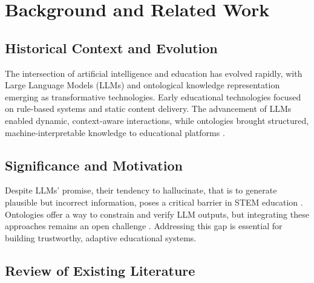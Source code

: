 \chapter{Background and Related Work}
\label{chap:background}


\section{Historical Context and Evolution}

The intersection of artificial intelligence and education has evolved rapidly, with Large Language Models (LLMs) and ontological knowledge representation emerging as transformative technologies. Early educational technologies focused on rule-based systems and static content delivery. The advancement of LLMs enabled dynamic, context-aware interactions, while ontologies brought structured, machine-interpretable knowledge to educational platforms \cite{ji2023survey}.


\section{Significance and Motivation}

Despite LLMs' promise, their tendency to hallucinate, that is to generate plausible but incorrect information, poses a critical barrier in STEM education \cite{ji2023survey, nananukul2023halo}. Ontologies offer a way to constrain and verify LLM outputs, but integrating these approaches remains an open challenge \cite{hartl2024knowledge, enterprise2024ontologies}. Addressing this gap is essential for building trustworthy, adaptive educational systems.


\section{Review of Existing Literature}

